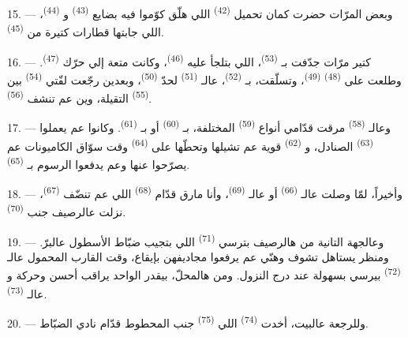 15. --- وبعض المرّات حضرت كمان تحميل  \textsuperscript{(42)}
اللي هلّق كوّموا فيه بضايع  \textsuperscript{(43)}
و \textsuperscript{(44)}، اللي جابتها قطارات كتيرة من
 \textsuperscript{(45)}.

\VUsaut{3.0mm}
\VUsaut{3.0mm}

16. --- كتير مرّات جدّفت بـ \textsuperscript{(53)}،
اللي بتلجأ عليه  \textsuperscript{(46)}، وكانت متعة إلي
حرّك  \textsuperscript{(47)}. وطلعت على 
\textsuperscript{(48)}  \textsuperscript{(49)}، وتسلّقت،
بـ \textsuperscript{(52)}، عالـ
\textsuperscript{(51)} لحدّ  \textsuperscript{(50)}،
وبعدين رجّعت لفّتي  \textsuperscript{(54)} بين
 \textsuperscript{(55)} التقيلة، وين عم تنشف
 \textsuperscript{(56)}.

17. --- وعالـ \textsuperscript{(58)} مرقت قدّامي أنواع
 \textsuperscript{(59)} المختلفة، بـ
\textsuperscript{(60)} أو بـ \textsuperscript{(61)}. وكانوا
عم يعملوا  \textsuperscript{(63)} الصنادل، و
\textsuperscript{(62)} قوية عم تشيلها وتحطّها على 
\textsuperscript{(64)} وقت سوّاق الكاميونات عم يصرّحوا عنها وعم يدفعوا
الرسوم بـ \textsuperscript{(65)}.

18. --- وأخيراً، لمّا وصلت عالـ \textsuperscript{(66)}
أو عالـ \textsuperscript{(69)}، وأنا مارق قدّام
 \textsuperscript{(68)} اللي عم تنضّف 
\textsuperscript{(67)}، نزلت عالرصيف جنب 
\textsuperscript{(70)}.

19. --- وعالجهة التانية من هالرصيف بترسي 
\textsuperscript{(71)} اللي بتجيب ضبّاط الأسطول عالبرّ. ومنظر يستاهل
تشوف  وهنّي عم يرفعوا مجاديفهن بإيقاع، وقت القارب
المحمول عالـ \textsuperscript{(72)} بيرسي بسهولة عند درج
النزول. ومن هالمحلّ، بيقدر الواحد يراقب أحسن 
وحركة  و عالـ
\textsuperscript{(73)}.

\VUsaut{3.0mm}
\VUsaut{3.0mm}

20. --- وللرجعة عالبيت، أخدت 
\textsuperscript{(74)} اللي  \textsuperscript{(75)} جنب
 المحطوط قدّام نادي الضبّاط.

